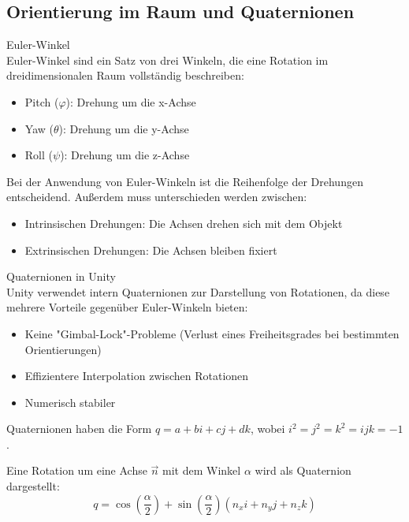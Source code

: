 \subsection{Orientierung im Raum und Quaternionen}
\begin{concept}{Euler-Winkel}\\
    Euler-Winkel sind ein Satz von drei Winkeln, die eine Rotation im dreidimensionalen Raum vollständig beschreiben:
    \begin{itemize}
        \item Pitch ($\varphi$): Drehung um die x-Achse
        \item Yaw ($\theta$): Drehung um die y-Achse
        \item Roll ($\psi$): Drehung um die z-Achse
    \end{itemize}
    
    Bei der Anwendung von Euler-Winkeln ist die Reihenfolge der Drehungen entscheidend. Außerdem muss unterschieden werden zwischen:
    \begin{itemize}
        \item Intrinsischen Drehungen: Die Achsen drehen sich mit dem Objekt
        \item Extrinsischen Drehungen: Die Achsen bleiben fixiert
    \end{itemize}
\end{concept}

\begin{concept}{Quaternionen in Unity}\\
    Unity verwendet intern Quaternionen zur Darstellung von Rotationen, da diese mehrere Vorteile gegenüber Euler-Winkeln bieten:
    \begin{itemize}
        \item Keine "Gimbal-Lock"-Probleme (Verlust eines Freiheitsgrades bei bestimmten Orientierungen)
        \item Effizientere Interpolation zwischen Rotationen
        \item Numerisch stabiler
    \end{itemize}
    
    Quaternionen haben die Form $q = a + bi + cj + dk$, wobei $i^2 = j^2 = k^2 = ijk = -1$.
    
    Eine Rotation um eine Achse $\vec{n}$ mit dem Winkel $\alpha$ wird als Quaternion dargestellt:
    \begin{equation}
        q = \cos\left(\frac{\alpha}{2}\right) + \sin\left(\frac{\alpha}{2}\right)(n_xi + n_yj + n_zk)
    \end{equation}
\end{concept}

